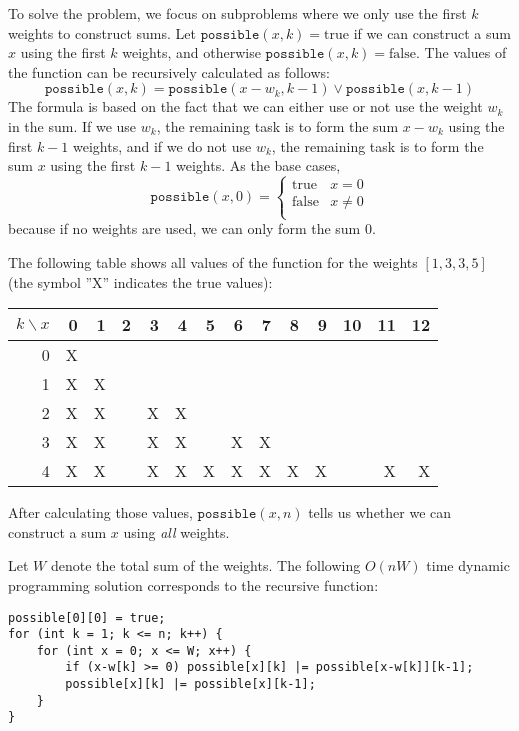 To solve the problem, we focus on subproblems
where we only use the first $k$ weights
to construct sums.
Let $\texttt{possible}(x,k)=\textrm{true}$ if
we can construct a sum $x$
using the first $k$ weights,
and otherwise $\texttt{possible}(x,k)=\textrm{false}$.
The values of the function can be recursively
calculated as follows:
\[ \texttt{possible}(x,k) = \texttt{possible}(x-w_k,k-1) \lor \texttt{possible}(x,k-1) \]
The formula is based on the fact that we can
either use or not use the weight $w_k$ in the sum.
If we use $w_k$, the remaining task is to
form the sum $x-w_k$ using the first $k-1$ weights,
and if we do not use $w_k$,
the remaining task is to form the sum $x$
using the first $k-1$ weights.
As the base cases,
\begin{equation*}
    \texttt{possible}(x,0) = \begin{cases}
               \textrm{true}    & x = 0\\
               \textrm{false}   & x \neq 0 \\
           \end{cases}
\end{equation*}
because if no weights are used,
we can only form the sum 0.

The following table shows all values of the function
for the weights $[1,3,3,5]$ (the symbol ''X''
indicates the true values):

\begin{center}
\begin{tabular}{r|rrrrrrrrrrrrr}
$k \backslash x$ & 0 & 1 & 2 & 3 & 4 & 5 & 6 & 7 & 8 & 9 & 10 & 11 & 12 \\
\hline
 0 & X & \\
 1 & X & X \\
 2 & X & X & & X & X \\
 3 & X & X & & X & X & & X & X \\
 4 & X & X & & X & X & X & X & X & X & X & & X & X \\
\end{tabular}
\end{center}

After calculating those values, $\texttt{possible}(x,n)$
tells us whether we can construct a
sum $x$ using \emph{all} weights.

Let $W$ denote the total sum of the weights.
The following $O(nW)$ time
dynamic programming solution
corresponds to the recursive function:
\begin{lstlisting}
possible[0][0] = true;
for (int k = 1; k <= n; k++) {
    for (int x = 0; x <= W; x++) {
        if (x-w[k] >= 0) possible[x][k] |= possible[x-w[k]][k-1];
        possible[x][k] |= possible[x][k-1];
    }
}
\end{lstlisting}

